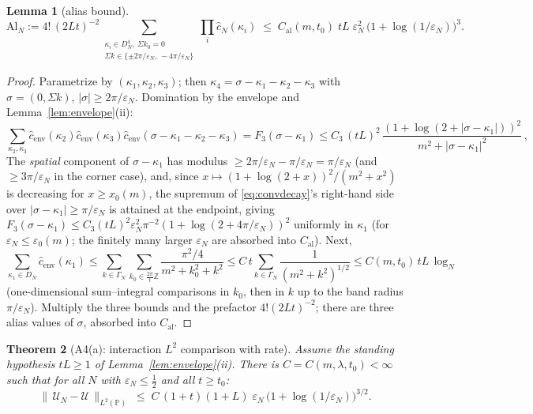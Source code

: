 \documentclass[11pt,a4paper]{article}
\theoremstyle{plain}
\newtheorem{theorem}{Theorem}[section]
\newtheorem{lemma}[theorem]{Lemma}
\theoremstyle{definition}
\newcommand{\Z}{\mathbb{Z}}
\newcommand{\PP}{\mathbb{P}}
\newcommand{\eps}{\varepsilon}
\newcommand{\U}{\mathcal U}
\begin{document}
\begin{lemma}[alias bound]\label{lem:alias}
\begin{equation}
 \mathrm{Al}_N:=4!\,(2Lt)^{-2}\!\!\!
 \sum_{\substack{\kappa_i\in D_N^4,\ \Sigma k_0=0\\
 \Sigma k\in\{\pm2\pi/\eps_N,\,-4\pi/\eps_N\}}}\!\!\!
 \prod_i\hat c_N(\kappa_i)
 \;\le\;C_{\mathrm{al}}(m,t_0)\;tL\;
 \eps_N^{2}\,\bigl(1+\log(1/\eps_N)\bigr)^{3}.
 \label{eq:alias}
\end{equation}
\end{lemma}

\begin{proof}
Parametrize by $(\kappa_1,\kappa_2,\kappa_3)$; then
$\kappa_4=\sigma-\kappa_1-\kappa_2-\kappa_3$ with
$\sigma=(0,\Sigma k)$, $|\sigma|\ge2\pi/\eps_N$. Domination by the envelope
and Lemma~\ref{lem:envelope}(ii):
\[
 \sum_{\kappa_2,\kappa_3}\hat c_{\mathrm{env}}(\kappa_2)
 \hat c_{\mathrm{env}}(\kappa_3)
 \hat c_{\mathrm{env}}(\sigma-\kappa_1-\kappa_2-\kappa_3)
 =F_3(\sigma-\kappa_1)
 \le C_3\,(tL)^2\,\frac{(1+\log(2+|\sigma-\kappa_1|))^2}
 {m^2+|\sigma-\kappa_1|^2}\,,
\]
The \emph{spatial} component of $\sigma-\kappa_1$ has modulus
$\ge2\pi/\eps_N-\pi/\eps_N=\pi/\eps_N$ (and $\ge3\pi/\eps_N$ in the corner
case), and, since $x\mapsto(1+\log(2+x))^2/(m^2+x^2)$ is decreasing for
$x\ge x_0(m)$, the supremum of \eqref{eq:convdecay}'s right-hand side over
$|\sigma-\kappa_1|\ge\pi/\eps_N$ is attained at the endpoint, giving
$F_3(\sigma-\kappa_1)\le C_3(tL)^2\eps_N^2\pi^{-2}
(1+\log(2+4\pi/\eps_N))^2$ uniformly in $\kappa_1$ (for
$\eps_N\le\eps_0(m)$; the finitely many larger $\eps_N$ are absorbed into
$C_{\mathrm{al}}$). Next,
\[
 \sum_{\kappa_1\in D_N}\hat c_{\mathrm{env}}(\kappa_1)
 \le\sum_{k\in\Gamma_N}\sum_{k_0\in\frac{2\pi}t\Z}
 \frac{\pi^2/4}{m^2+k_0^2+k^2}
 \le C\,t\!\!\sum_{k\in\Gamma_N}\!\!\frac1{(m^2+k^2)^{1/2}}
 \le C(m,t_0)\,tL\,\log_N
\]
(one-dimensional sum--integral comparisons in $k_0$, then in $k$ up to the
band radius $\pi/\eps_N$). Multiply the three bounds and the prefactor
$4!(2Lt)^{-2}$; there are three alias values of $\sigma$, absorbed into
$C_{\mathrm{al}}$.
\end{proof}

\begin{theorem}[A4(a): interaction $L^2$ comparison with rate]
\label{thm:A4a}
Assume the standing hypothesis $tL\ge1$ of Lemma~\ref{lem:envelope}(ii). There is
$C=C(m,\lambda,t_0)<\infty$ such that for all $N$ with
$\eps_N\le\tfrac12$ and all $t\ge t_0$:
\begin{equation}
 \bigl\|\,\U_N-\U\,\bigr\|_{L^2(\PP)}
 \;\le\;C\,(1+t)(1+L)\;\eps_N\,\bigl(1+\log(1/\eps_N)\bigr)^{3/2}.
 \label{eq:A4a}
\end{equation}
\end{theorem}
\end{document}
